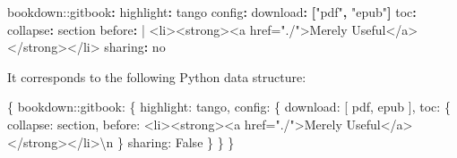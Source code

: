 \documentclass[
]{krantz}
\makeatletter
\newenvironment{Shaded}{\begin{snugshade}}{\end{snugshade}}
\newcommand{\AttributeTok}[1]{\textcolor[rgb]{0.77,0.63,0.00}{#1}}
\newcommand{\CharTok}[1]{\textcolor[rgb]{0.31,0.60,0.02}{#1}}
\newcommand{\FunctionTok}[1]{\textcolor[rgb]{0.00,0.00,0.00}{#1}}
\newcommand{\KeywordTok}[1]{\textcolor[rgb]{0.13,0.29,0.53}{\textbf{#1}}}
\newcommand{\NormalTok}[1]{#1}
\newcommand{\StringTok}[1]{\textcolor[rgb]{0.31,0.60,0.02}{#1}}
\newcommand{\VariableTok}[1]{\textcolor[rgb]{0.00,0.00,0.00}{#1}}
\newenvironment{kframe}{%
\medskip{}
\setlength{\fboxsep}{.8em}
 \def\at@end@of@kframe{}%
 \ifinner\ifhmode%
  \def\at@end@of@kframe{\end{minipage}}%
  \begin{minipage}{\columnwidth}%
 \fi\fi%
 \def\FrameCommand##1{\hskip\@totalleftmargin \hskip-\fboxsep
 \colorbox{shadecolor}{##1}\hskip-\fboxsep
     \hskip-\linewidth \hskip-\@totalleftmargin \hskip\columnwidth}%
 \MakeFramed {\advance\hsize-\width
   \@totalleftmargin\z@ \linewidth\hsize
   \@setminipage}}%
 {\par\unskip\endMakeFramed%
 \at@end@of@kframe}
\renewenvironment{Shaded}{\begin{kframe}}{\end{kframe}}
\makeatother
\begin{document}
\begin{Shaded}
\begin{Highlighting}[]
\AttributeTok{bookdown:}\FunctionTok{:gitbook}\KeywordTok{:}
\AttributeTok{  }\FunctionTok{highlight}\KeywordTok{:}\AttributeTok{ tango}
\AttributeTok{  }\FunctionTok{config}\KeywordTok{:}
\AttributeTok{    }\FunctionTok{download}\KeywordTok{:}\AttributeTok{ }\KeywordTok{[}\StringTok{"pdf"}\KeywordTok{,}\AttributeTok{ }\StringTok{"epub"}\KeywordTok{]}
\AttributeTok{    }\FunctionTok{toc}\KeywordTok{:}
\AttributeTok{      }\FunctionTok{collapse}\KeywordTok{:}\AttributeTok{ section}
\FunctionTok{      before}\KeywordTok{: }\CharTok{|}
\NormalTok{        \textless{}li\textgreater{}\textless{}strong\textgreater{}\textless{}a href="./"\textgreater{}Merely Useful\textless{}/a\textgreater{}\textless{}/strong\textgreater{}\textless{}/li\textgreater{}}
\AttributeTok{    }\FunctionTok{sharing}\KeywordTok{:}\AttributeTok{ }\CharTok{no}
\end{Highlighting}
\end{Shaded}

It corresponds to the following Python data structure:

\begin{Shaded}
\begin{Highlighting}[]
\NormalTok{\{}
  \StringTok{\textquotesingle{}bookdown::gitbook\textquotesingle{}}\NormalTok{: \{}
    \StringTok{\textquotesingle{}highlight\textquotesingle{}}\NormalTok{: }\StringTok{\textquotesingle{}tango\textquotesingle{}}\NormalTok{,}
    \StringTok{\textquotesingle{}config\textquotesingle{}}\NormalTok{: \{}
      \StringTok{\textquotesingle{}download\textquotesingle{}}\NormalTok{: [}
        \StringTok{\textquotesingle{}pdf\textquotesingle{}}\NormalTok{,}
        \StringTok{\textquotesingle{}epub\textquotesingle{}}
\NormalTok{      ],}
      \StringTok{\textquotesingle{}toc\textquotesingle{}}\NormalTok{: \{}
        \StringTok{\textquotesingle{}collapse\textquotesingle{}}\NormalTok{: }\StringTok{\textquotesingle{}section\textquotesingle{}}\NormalTok{,}
        \StringTok{\textquotesingle{}before\textquotesingle{}}\NormalTok{: }\StringTok{\textquotesingle{}\textless{}li\textgreater{}\textless{}strong\textgreater{}\textless{}a href="./"\textgreater{}Merely Useful\textless{}/a\textgreater{}\textless{}/strong\textgreater{}\textless{}/li\textgreater{}}\CharTok{\textbackslash{}n}\StringTok{\textquotesingle{}}
\NormalTok{      \}}
      \StringTok{\textquotesingle{}sharing\textquotesingle{}}\NormalTok{: }\VariableTok{False}
\NormalTok{    \}}
\NormalTok{  \}}
\NormalTok{\}}
\end{Highlighting}
\end{Shaded}
\end{document}
